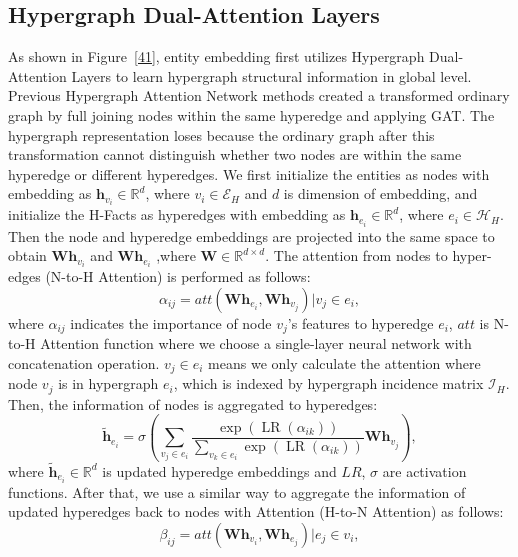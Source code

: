 \documentclass[11pt]{article}
\begin{document}
\subsection{Hypergraph Dual-Attention Layers}
As shown in Figure~\ref{41}, entity embedding first utilizes Hypergraph Dual-Attention Layers to learn hypergraph structural information in global level. Previous Hypergraph Attention Network methods created a transformed ordinary graph by full joining nodes within the same hyperedge and applying GAT. The hypergraph representation loses because the ordinary graph after this transformation cannot distinguish whether two nodes are within the same hyperedge or different hyperedges. We first initialize the entities as nodes with embedding as $\boldsymbol{h}_{v_i} \in \mathbb{R}^d$, where $v_i \in \mathcal{E}_H$ and $d$ is dimension of embedding, and initialize the H-Facts as hyperedges with embedding as $\boldsymbol{h}_{e_i} \in \mathbb{R}^d$, where $e_i \in \mathcal{H}_H$. Then the node and hyperedge embeddings are projected into the same space to obtain $\mathbf{W} \boldsymbol{h}_{v_i}$ and $\mathbf{W} \boldsymbol{h}_{e_i}$ ,where $\mathbf{W} \in \mathbb{R}^{d \times d}$. The attention from nodes to hyper-edges (N-to-H Attention) is performed as follows:
\begin{equation}
\alpha_{i j}=att\left(\mathbf{W} \boldsymbol{h}_{e_i}, \mathbf{W} \boldsymbol{h}_{v_j}\right) | v_j \in e_i,
\end{equation}
where $\alpha_{i j}$ indicates the importance of node $v_j$’s features to hyperedge $e_i$, $att$ is N-to-H Attention function where we choose a single-layer neural network with concatenation operation. $v_j \in e_i$ means we only calculate the attention where node $v_j$ is in hypergraph $e_i$, which is indexed by hypergraph incidence matrix $\mathcal{I}_H$. Then, the information of nodes is aggregated to hyperedges:
\begin{equation}
\tilde{\boldsymbol{h}}_{e_i}=\sigma\left(\sum_{v_j \in e_i} \frac{\exp\left(\operatorname{LR}\left(\alpha_{i k}\right)\right)}{\sum_{v_k \in e_i} \exp \left(\operatorname{LR}\left(\alpha_{i k}\right)\right)} \mathbf{W} \boldsymbol{h}_{v_j}\right),
\end{equation}
where $\tilde{\boldsymbol{h}}_{e_i} \in \mathbb{R}^d$ is updated hyperedge embeddings and $LR$, $\sigma$ are activation functions. After that, we use a similar way to aggregate the information of updated hyperedges back to nodes with Attention (H-to-N Attention) as follows:
\begin{equation}
\beta_{i j}=att\left(\mathbf{W} \boldsymbol{h}_{v_i}, \mathbf{W} \boldsymbol{h}_{e_j}\right) | e_j \in v_i,
\end{equation}
\end{document}
